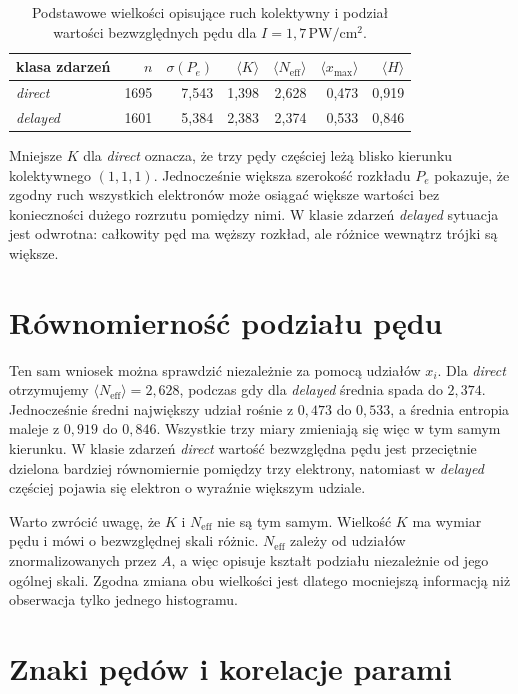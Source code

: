 \documentclass[12pt,letterpaper,oneside]{report}
\numberwithin{equation}{chapter}
\numberwithin{figure}{chapter}
\numberwithin{table}{chapter}
\newcommand{\direct}{\textit{direct}}
\newcommand{\delayed}{\textit{delayed}}
\begin{document}
\begin{table}[htbp]
\centering
\caption{Podstawowe wielkości opisujące ruch kolektywny i podział wartości bezwzględnych pędu dla $I=1{,}7\,\mathrm{PW/cm^2}$.}
\label{tab:summary}
\begin{tabular}{lrrrrrr}
\toprule
klasa zdarzeń & $n$ & $\sigma(P_e)$ & $\langle K\rangle$ & $\langle N_{\mathrm{eff}}\rangle$ & $\langle x_{\max}\rangle$ & $\langle H\rangle$\\
\midrule
\direct  & 1695 & 7,543 & 1,398 & 2,628 & 0,473 & 0,919\\
\delayed & 1601 & 5,384 & 2,383 & 2,374 & 0,533 & 0,846\\
\bottomrule
\end{tabular}
\end{table}

Mniejsze $K$ dla \direct{} oznacza, że trzy pędy częściej leżą blisko kierunku kolektywnego $(1,1,1)$. Jednocześnie większa szerokość rozkładu $P_e$ pokazuje, że zgodny ruch wszystkich elektronów może osiągać większe wartości bez konieczności dużego rozrzutu pomiędzy nimi. W klasie zdarzeń \delayed{} sytuacja jest odwrotna: całkowity pęd ma węższy rozkład, ale różnice wewnątrz trójki są większe.

\section{Równomierność podziału pędu}

Ten sam wniosek można sprawdzić niezależnie za pomocą udziałów $x_i$. Dla \direct{} otrzymujemy $\langle N_{\mathrm{eff}}\rangle=2{,}628$, podczas gdy dla \delayed{} średnia spada do $2{,}374$. Jednocześnie średni największy udział rośnie z $0{,}473$ do $0{,}533$, a średnia entropia maleje z $0{,}919$ do $0{,}846$. Wszystkie trzy miary zmieniają się więc w tym samym kierunku. W klasie zdarzeń \direct{} wartość bezwzględna pędu jest przeciętnie dzielona bardziej równomiernie pomiędzy trzy elektrony, natomiast w \delayed{} częściej pojawia się elektron o wyraźnie większym udziale.

Warto zwrócić uwagę, że $K$ i $N_{\mathrm{eff}}$ nie są tym samym. Wielkość $K$ ma wymiar pędu i mówi o bezwzględnej skali różnic. $N_{\mathrm{eff}}$ zależy od udziałów znormalizowanych przez $A$, a więc opisuje kształt podziału niezależnie od jego ogólnej skali. Zgodna zmiana obu wielkości jest dlatego mocniejszą informacją niż obserwacja tylko jednego histogramu.

\section{Znaki pędów i korelacje parami}
\end{document}
